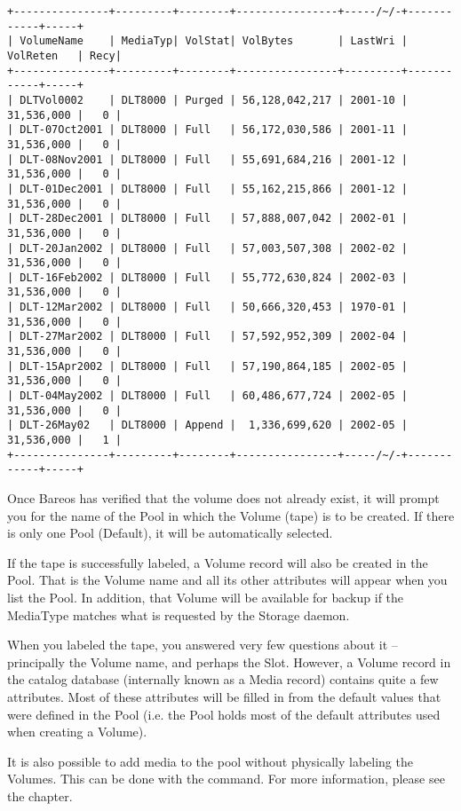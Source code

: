 \footnotesize
\begin{verbatim}
+---------------+---------+--------+----------------+-----/~/-+------------+-----+
| VolumeName    | MediaTyp| VolStat| VolBytes       | LastWri | VolReten   | Recy|
+---------------+---------+--------+----------------+---------+------------+-----+
| DLTVol0002    | DLT8000 | Purged | 56,128,042,217 | 2001-10 | 31,536,000 |   0 |
| DLT-07Oct2001 | DLT8000 | Full   | 56,172,030,586 | 2001-11 | 31,536,000 |   0 |
| DLT-08Nov2001 | DLT8000 | Full   | 55,691,684,216 | 2001-12 | 31,536,000 |   0 |
| DLT-01Dec2001 | DLT8000 | Full   | 55,162,215,866 | 2001-12 | 31,536,000 |   0 |
| DLT-28Dec2001 | DLT8000 | Full   | 57,888,007,042 | 2002-01 | 31,536,000 |   0 |
| DLT-20Jan2002 | DLT8000 | Full   | 57,003,507,308 | 2002-02 | 31,536,000 |   0 |
| DLT-16Feb2002 | DLT8000 | Full   | 55,772,630,824 | 2002-03 | 31,536,000 |   0 |
| DLT-12Mar2002 | DLT8000 | Full   | 50,666,320,453 | 1970-01 | 31,536,000 |   0 |
| DLT-27Mar2002 | DLT8000 | Full   | 57,592,952,309 | 2002-04 | 31,536,000 |   0 |
| DLT-15Apr2002 | DLT8000 | Full   | 57,190,864,185 | 2002-05 | 31,536,000 |   0 |
| DLT-04May2002 | DLT8000 | Full   | 60,486,677,724 | 2002-05 | 31,536,000 |   0 |
| DLT-26May02   | DLT8000 | Append |  1,336,699,620 | 2002-05 | 31,536,000 |   1 |
+---------------+---------+--------+----------------+-----/~/-+------------+-----+
\end{verbatim}
\normalsize

Once Bareos has verified that the volume does not already exist, it will
prompt you for the name of the Pool in which the Volume (tape) is to be
created.  If there is only one Pool (Default), it will be automatically
selected.

If the tape is successfully labeled, a Volume record will also be created in
the Pool. That is the Volume name and all its other attributes will appear
when you list the Pool. In addition, that Volume will be available for backup
if the MediaType matches what is requested by the Storage daemon.

When you labeled the tape, you answered very few questions about it --
principally the Volume name, and perhaps the Slot. However, a Volume record in
the catalog database (internally known as a Media record) contains quite a few
attributes. Most of these attributes will be filled in from the default values
that were defined in the Pool (i.e. the Pool holds most of the default
attributes used when creating a Volume).

It is also possible to add media to the pool without physically labeling the
Volumes. This can be done with the  command. For more information,
please see the
 chapter.
